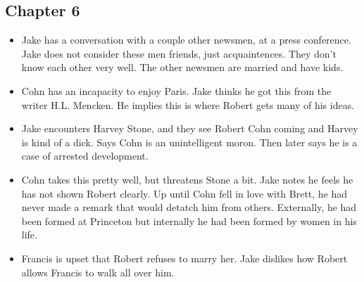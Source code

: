 \documentclass[11pt]{article}
\begin{document}
\subsection{Chapter 6}
\begin{itemize}
	\item Jake has a conversation with a couple other newsmen, at a press 
		conference.  Jake does not consider these men friends, just 
		acquaintences.  They don't know each other very well.  The other 
		newsmen are married and have kids.
	\item Cohn has an incapacity to enjoy Paris.  Jake thinks he got this from 
		the writer H.L. Mencken.  He implies this is where Robert gets many of 
		his ideas. 
	\item Jake encounters Harvey Stone, and they see Robert Cohn coming and 
		Harvey is kind of a dick.  Says Cohn is an unintelligent moron.  Then 
		later says he is a case of arrested development.
	\item Cohn takes this pretty well, but threatens Stone a bit.  Jake notes 
		he feels he has not shown Robert clearly.  Up until Cohn fell in love 
		with Brett, he had never made a remark that would detatch him from 
		others.  Externally, he had been formed at Princeton but internally he 
		had been formed by women in his life.
	\item Francis is upset that Robert refuses to marry her.  Jake dislikes 
		how Robert allows Francis to walk all over him.
\end{itemize}
\end{document}
